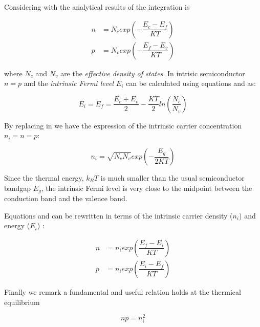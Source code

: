 Considering  with  the analytical results of the integration is

\begin{align}
n & = N_c exp\left(-\dfrac{E_c-E_f}{KT}\right) \label{eq: n density fd}\\
p & = N_v exp\left(-\dfrac{E_f-E_v}{KT}\right)  \label{eq: p density fd}
\end{align}

where $N_c$ and $N_v$ are the \textit{effective density of states}.
In intrisic semiconductor $n=p$ and the \textit{intrinsic Fermi level} $E_i$ can be calculated using equations  and  as:

\begin{equation}
\label{eq: midgap equilibrium}
E_i=E_f=\dfrac{E_c+E_v}{2} - \dfrac{KT}{2}ln\left(\dfrac{N_c}{N_v}\right)
\end{equation}

By replacing  in  we have the expression of the intrinsic carrier concentration $n_i=n=p$:


\begin{equation}
\label{eq: ni equilibrium NcNv}
n_i = \sqrt{N_cN_v}exp\left(-\dfrac{E_g}{2KT}\right)
\end{equation}

\begin{Osservazione}
Since the thermal energy, $k_BT$ is much smaller than the usual semiconductor bandgap $E_g$, the intrinsic Fermi level is very close to the midpoint between the conduction band and the valence band.
\end{Osservazione}

Equations  and  can be rewritten in terms of the intrinsic carrier density ($n_i$) and energy ($E_i$) :

\begin{align}
n & = n_i exp\left(\dfrac{E_f-E_i}{KT}\right) \label{eq: n density mb}\\
p & = n_i exp\left(\dfrac{E_i-E_f}{KT}\right)  \label{eq: p density mb}
\end{align}

Finally we remark a fundamental and useful relation holds at the thermical equilibrium

\begin{equation}
\label{eq: legge di azione di massa}
np=n_i^2
\end{equation}

